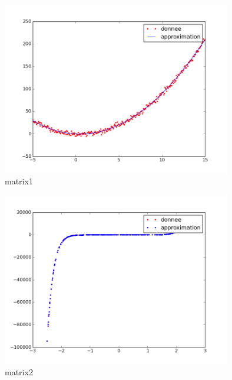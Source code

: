 \documentclass[a4paper,10pt]{report}
\begin{document}
\begin{figure}[H]
 \centering
 \caption{matrix1}
 \includegraphics[width=10cm]{matrix1.png}
\end{figure}

\begin{figure}[!h]
 \centering
 \caption{matrix2}
 \includegraphics[width=10cm]{matrix2.png}
\end{figure}
\end{document}
